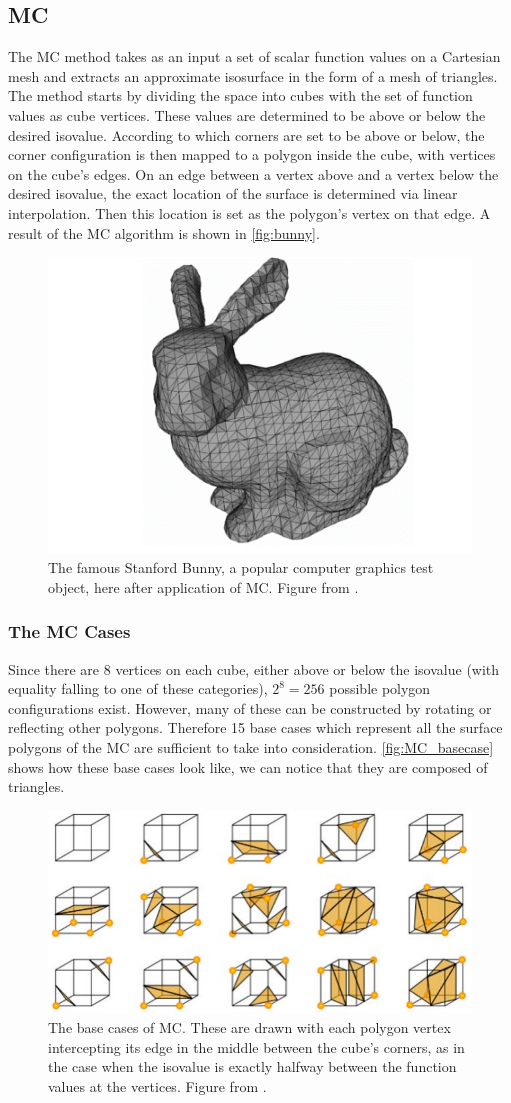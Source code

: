 \subsection{\Acl{MC}} 
The \acf{MC} method \cite{Marching2006} takes as an input a set of scalar function values on a Cartesian mesh and extracts an approximate isosurface in the form of a mesh of triangles. The method starts by dividing the space into cubes with the set of function values as cube vertices. These values are determined to be above or below the desired isovalue. According to which corners are set to be above or below, the corner configuration is then mapped to a polygon inside the cube, with vertices on the cube's edges. On an edge between a vertex above and a vertex below the desired isovalue, the exact location of the surface is determined via linear interpolation. Then this location is set as the polygon's vertex on that edge. A result of the \ac{MC} algorithm is shown in \autoref{fig:bunny}.

\begin{figure}
\centering
   \includegraphics[width=.25\textwidth]{Pictures/SurfaceReconstruction/new_bunny.png}
   \caption{The famous Stanford Bunny, a popular computer graphics test object, here after application of \ac{MC}. Figure from \cite{NielsonParametrization}. }
   \label{fig:bunny}
\end{figure}


\subsubsection{The \acl{MC} Cases}
Since there are 8 vertices on each cube, either above or below the isovalue (with equality falling to one of these categories), $2^8=256$ possible polygon configurations exist. However, many of these can be constructed by rotating or reflecting other polygons. Therefore 15 base cases which represent all the surface polygons of the \acl{MC} are sufficient to take into consideration. \autoref{fig:MC_basecase} shows how these base cases look like, we can notice that they are composed of triangles. 

\begin{figure}
\centering
   \includegraphics[width=.5\textwidth]{Pictures/cubes.pdf}
   \caption{The base cases of \ac{MC}. These are drawn with each polygon vertex intercepting its edge in the middle between the cube's corners, as in the case when the isovalue is exactly halfway between the function values at the vertices. Figure from \cite{Marching2006}.}
   \label{fig:MC_basecase}
\end{figure}

